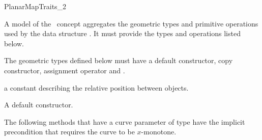 
\ccRefPageBegin

\begin{ccRefConcept}{PlanarMapTraits_2}
\label{PM_sec:req:interface} 
 


\ccDefinition
A model of the \ccRefName\ concept aggregates the geometric types and
primitive operations used by the data structure .
It must provide the types and operations listed below.

\ccTypes

The geometric types defined below must have a default constructor,
copy constructor, assignment operator and .
    



{a constant describing the relative position between objects.}
   
\ccCreation
    

{A default constructor.}

\ccOperations
The following methods that have a curve parameter of type
 have the implicit precondition that requires the
curve to be $x$-monotone.



\end{ccRefConcept}
